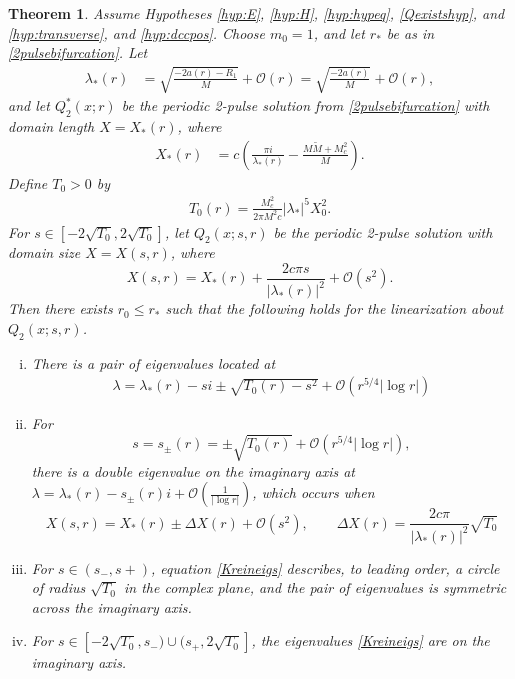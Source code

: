 \documentclass[10pt,reqno]{amsart}
\theoremstyle{plain}
\newtheorem{theorem}{Theorem}
\theoremstyle{definition}
\theoremstyle{remark}
\numberwithin{theorem}{section}
\numberwithin{equation}{section}
\begin{document}
\begin{theorem}\label{th:Kreinbubble}
Assume Hypotheses \ref{hyp:E}, \ref{hyp:H}, \ref{hyp:hypeq}, \ref{Qexistshyp}, and \ref{hyp:transverse}, and \ref{hyp:dccpos}. Choose $m_0 = 1$, and let $r_*$ be as in \cref{2pulsebifurcation}. Let 
\begin{align}\label{deflambdastar}
\lambda_*(r) &= \sqrt{ \frac{-2a(r) - R_1 }{M} } + \mathcal{O}(r) = \sqrt{ \frac{-2a(r)}{M} } + \mathcal{O}(r),
\end{align}
and let $Q_2^*(x; r)$ be the periodic 2-pulse solution from \cref{2pulsebifurcation} with domain length $X = X_*(r)$, where
\begin{align}\label{defXstar}
X_*(r) &= c \left( \frac{\pi i}{\lambda_*(r)} - \frac{M \tilde{M} + M_c^2 }{M}\right).
\end{align}
Define $T_0 > 0$ by 
\begin{align}\label{defT0}
T_0(r) = \frac{M_c^2 }{2 \pi M^2 c } |\lambda_*|^5 X_0^2.
\end{align}
For $s \in [-2\sqrt{T_0}, 2 \sqrt{T_0}]$, let $Q_2(x; s, r)$ be the periodic 2-pulse solution with domain size $X = X(s, r)$, where
\begin{equation}
X(s,r) = X_*(r) + \frac{2 c \pi s}{|\lambda_*(r)|^2} + \mathcal{O}(s^2).
\end{equation}
Then there exists $r_0 \leq r_*$ such that the following holds for the linearization about $Q_2(x; s, r)$.
\begin{enumerate}[(i)]
	\item There is a pair of eigenvalues located at
	\begin{align}\label{Kreineigs}
	\lambda = \lambda_*(r) - s i \pm \sqrt{ T_0(r) -  s^2} + \mathcal{O}\left(r^{5/4}|\log r| \right)
	\end{align}

	\item For
	\[
	s = s_\pm(r) = \pm \sqrt{T_0(r)} + \mathcal{O}\left(r^{5/4}|\log r| \right),
	\]
	there is a double eigenvalue on the imaginary axis at $\lambda = \lambda_*(r) - s_\pm(r) i + \mathcal{O}\left(\frac{1}{|\log r|} \right)$, which occurs when 
	\begin{equation}\label{KreinDeltaX}
	X(s, r) = X_*(r) \pm \Delta X(r) + \mathcal{O}(s^2), \qquad \Delta X(r) = \frac{2 c \pi}{|\lambda_*(r)|^2}\sqrt{T_0} 
	\end{equation}
\item For $s \in (s_-, s+)$, equation \cref{Kreineigs} describes, to leading order, a circle of radius $\sqrt{T_0}$ in the complex plane, and the pair of eigenvalues is symmetric across the imaginary axis.
\item For $s \in [-2\sqrt{T_0}, s_-) \cup (s_+, 2 \sqrt{T_0}]$, the eigenvalues \cref{Kreineigs} are on the imaginary axis.
\end{enumerate}
\end{theorem}
\end{document}
